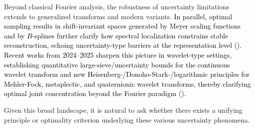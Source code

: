 \documentclass[preprint,hidelinks,authoryear]{elsarticle}
\theoremstyle{plain}
\theoremstyle{definition}
\theoremstyle{remark}
\begin{document}
Beyond classical Fourier analysis, the robustness of uncertainty limitations extends to generalized transforms and modern variants. \textcolor{black}{In parallel, optimal sampling results in shift-invariant spaces generated by Meyer scaling functions and by $B$-splines further clarify how spectral localization constrains stable reconstruction, echoing uncertainty-type barriers at the representation level (\cite{selvan2017optimal,selvan2016sampling}). Recent works from 2024–2025 sharpen this picture in wavelet-type settings, establishing quantitative large-sieve/uncertainty bounds for the continuous wavelet transform and new Heisenberg-/Donoho-Stark-/logarithmic principles for Mehler-Fock, metaplectic, and quaternionic wavelet transforms, thereby clarifying optimal joint concentration beyond the Fourier paradigm (\cite{abreu2025donoho,dades2024heisenberg,dades2025new,dar2024n,wang2024benedicks}).}

Given this broad landscape, 
it is natural to ask whether there exists a unifying principle or optimality criterion underlying these various uncertainty phenomena.
\end{document}
